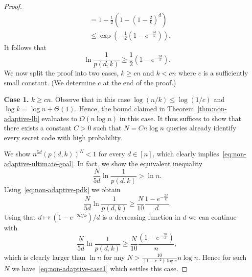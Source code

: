 \documentclass[english,a4paper,11pt]{article}
\newcommand{\comment}[1]{{\bf [#1]}}
\newcommand{\CW}[1]{\comment{\textcolor{blue}{CW: #1}}}
\begin{document}
{\begin{proof}
\begin{align*}
& = 1 - \frac12 \left(1 - \left(1 - \frac2k \right)^d \right) \\
& \le \exp \left( - \frac12 \left(1 - e^{- \frac{2d}{k}} \right) \right).
\end{align*}
It follows that
\begin{equation} \label{eq:non-adaptive-pdk}
\ln \frac 1{p(d,k)} \ge \frac12 \left( 1 - e^{- \frac{2d}{k}} \right) .
\end{equation}
We now split the proof into two cases, $k \ge cn$ and $k < cn$ where $c$ is a sufficiently small constant. (We determine $c$ at the end of the proof.) %

\textbf{Case 1.} $k \ge c n$. Observe that in this case $\log(n/k) \le \log(1/c)$ and $\log k = \log n + \Theta(1)$. 
Hence, the bound claimed in Theorem~\ref{thm:non-adaptive-lb} evaluates to $O(n \log n)$ in this case. %
It thus suffices to show that there exists a constant $C > 0$ such that $N = C n \log n$ queries already identify every secret code with high probability.

We show $n^{5d}(p(d,k))^N < 1$ for every $d \in [n]$, which clearly implies~\eqref{eq:non-adaptive-ultimate-goal}. In fact, we show the equivalent inequality
\begin{equation} \label{eq:non-adaptive-case1}
\frac{N}{5d} \ln \frac{1}{p(d,k)} > \ln n.
\end{equation}
Using~\eqref{eq:non-adaptive-pdk} we obtain
\begin{equation} \label{eq:non-adaptive-case1-step1}
\frac{N}{5d} \ln \frac{1}{p(d,k)} \ge \frac{N}{10} \frac{1-e^{-\frac{2d}{k}}}{d}.
\end{equation}
Using that $d \mapsto (1-e^{-2d/k})/d$ is a decreasing function in $d$ we can continue with
\[
\frac{N}{5d} \ln \frac{1}{p(d,k)} \ge \frac{N}{10} \frac{(1-e^{-\frac{2n}{k}})}{n},
\]
which is clearly larger than $\ln n$ for any $N > \frac{10}{(1-e^{-2}) \log e} n \log n$. Hence for such $N$ we have~\eqref{eq:non-adaptive-case1} which settles this case.


\end{proof}}
\end{document}
